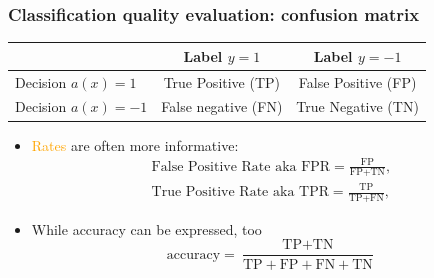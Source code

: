 \documentclass[usenames,dvipsnames,aspectratio=169]{beamer}
\begin{document}
\begin{frame}
\frametitle{Classification quality evaluation: confusion matrix}

\begin{table}[t]
    \centering
    \begin{tabular}{|l|c|c|}
        \hline
        & Label $y = 1$ & Label $y = -1$ \\ \hline
        Decision $a(x) = 1$ & True Positive (TP) & False Positive (FP) \\ \hline
        Decision $a(x) = -1$ & False negative (FN) & True Negative (TN) \\ \hline
    \end{tabular}
\end{table}

\begin{itemize}
    \pause
    \item \textcolor{orange}{Rates} are often more informative:
    \begin{align*}
    \text{False Positive Rate aka FPR}
    =
    \frac{
        \text{FP}
    }{
        \text{FP} + \text{TN}
    }, \\
    \text{True Positive Rate aka TPR}
    =
    \frac{
        \text{TP}
    }{
        \text{TP} + \text{FN}
    },
\end{align*}


\pause
\item While accuracy can be expressed, too
\[
    \text{accuracy}
    =
    \frac{\text{TP} + \text{TN}}{\text{TP} + \text{FP} + \text{FN} + \text{TN}}
\]

\end{itemize}

\end{frame}
\end{document}
